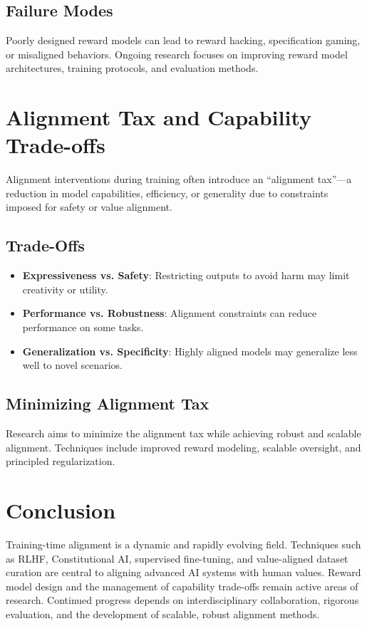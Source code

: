 \begin{TNtwocol}
\subsection{Failure Modes}
Poorly designed reward models can lead to reward hacking, specification gaming, or misaligned behaviors. Ongoing research focuses on improving reward model architectures, training protocols, and evaluation methods.

\section{Alignment Tax and Capability Trade-offs}
Alignment interventions during training often introduce an “alignment tax”—a reduction in model capabilities, efficiency, or generality due to constraints imposed for safety or value alignment.

\subsection{Trade-Offs}
\begin{itemize}
    \item \textbf{Expressiveness vs. Safety}: Restricting outputs to avoid harm may limit creativity or utility.
    \item \textbf{Performance vs. Robustness}: Alignment constraints can reduce performance on some tasks.
    \item \textbf{Generalization vs. Specificity}: Highly aligned models may generalize less well to novel scenarios.
\end{itemize}

\subsection{Minimizing Alignment Tax}
Research aims to minimize the alignment tax while achieving robust and scalable alignment. Techniques include improved reward modeling, scalable oversight, and principled regularization.

\section{Conclusion}
Training-time alignment is a dynamic and rapidly evolving field. Techniques such as RLHF, Constitutional AI, supervised fine-tuning, and value-aligned dataset curation are central to aligning advanced AI systems with human values. Reward model design and the management of capability trade-offs remain active areas of research. Continued progress depends on interdisciplinary collaboration, rigorous evaluation, and the development of scalable, robust alignment methods.

\end{TNtwocol}
